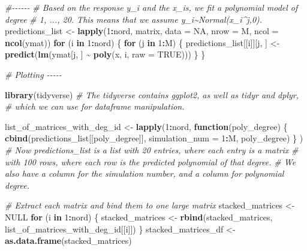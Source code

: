 \documentclass[
]{article}
\newenvironment{Shaded}{\begin{snugshade}}{\end{snugshade}}
\newcommand{\AttributeTok}[1]{\textcolor[rgb]{0.13,0.29,0.53}{#1}}
\newcommand{\CommentTok}[1]{\textcolor[rgb]{0.56,0.35,0.01}{\textit{#1}}}
\newcommand{\ConstantTok}[1]{\textcolor[rgb]{0.56,0.35,0.01}{#1}}
\newcommand{\ControlFlowTok}[1]{\textcolor[rgb]{0.13,0.29,0.53}{\textbf{#1}}}
\newcommand{\DecValTok}[1]{\textcolor[rgb]{0.00,0.00,0.81}{#1}}
\newcommand{\FunctionTok}[1]{\textcolor[rgb]{0.13,0.29,0.53}{\textbf{#1}}}
\newcommand{\NormalTok}[1]{#1}
\newcommand{\OtherTok}[1]{\textcolor[rgb]{0.56,0.35,0.01}{#1}}
\newcommand{\SpecialCharTok}[1]{\textcolor[rgb]{0.81,0.36,0.00}{\textbf{#1}}}
\begin{document}
\begin{Shaded}
\begin{Highlighting}[]
\CommentTok{\#{-}{-}{-}{-}{-}{-}}
\CommentTok{\# Based on the response y\_i and the x\_i\textquotesingle{}s, we fit a polynomial model of degree}
\CommentTok{\# 1, ..., 20. This means that we assume y\_i\textasciitilde{}Normal(x\_i\^{}j,0). }
\NormalTok{predictions\_list }\OtherTok{\textless{}{-}} \FunctionTok{lapply}\NormalTok{(}\DecValTok{1}\SpecialCharTok{:}\NormalTok{nord, matrix, }\AttributeTok{data =} \ConstantTok{NA}\NormalTok{, }\AttributeTok{nrow =}\NormalTok{ M, }\AttributeTok{ncol =} \FunctionTok{ncol}\NormalTok{(ymat))}
\ControlFlowTok{for}\NormalTok{ (i }\ControlFlowTok{in} \DecValTok{1}\SpecialCharTok{:}\NormalTok{nord) \{}
  \ControlFlowTok{for}\NormalTok{ (j }\ControlFlowTok{in} \DecValTok{1}\SpecialCharTok{:}\NormalTok{M) \{}
\NormalTok{    predictions\_list[[i]][j, ] }\OtherTok{\textless{}{-}} \FunctionTok{predict}\NormalTok{(}\FunctionTok{lm}\NormalTok{(ymat[j, ] }\SpecialCharTok{\textasciitilde{}} \FunctionTok{poly}\NormalTok{(x, i, }\AttributeTok{raw =} \ConstantTok{TRUE}\NormalTok{))) }
\NormalTok{  \}}
\NormalTok{\}}

\CommentTok{\# Plotting {-}{-}{-}{-}{-}}

\FunctionTok{library}\NormalTok{(tidyverse) }\CommentTok{\# The tidyverse contains ggplot2, as well as tidyr and dplyr, }
\CommentTok{\# which we can use for dataframe manipulation.}

\NormalTok{list\_of\_matrices\_with\_deg\_id }\OtherTok{\textless{}{-}} 
  \FunctionTok{lapply}\NormalTok{(}\DecValTok{1}\SpecialCharTok{:}\NormalTok{nord, }
         \ControlFlowTok{function}\NormalTok{(poly\_degree) \{}
           \FunctionTok{cbind}\NormalTok{(predictions\_list[[poly\_degree]], }
                 \AttributeTok{simulation\_num =} \DecValTok{1}\SpecialCharTok{:}\NormalTok{M, poly\_degree)}
\NormalTok{         \}}
\NormalTok{  )}
\CommentTok{\# Now predictions\_list is a list with 20 entries, where each entry is a matrix }
\CommentTok{\# with 100 rows, where each row is the predicted polynomial of that degree.}
\CommentTok{\# We also have a column for the simulation number, and a column for polynomial degree.}

\CommentTok{\# Extract each matrix and bind them to one large matrix}
\NormalTok{stacked\_matrices }\OtherTok{\textless{}{-}}  \ConstantTok{NULL}
\ControlFlowTok{for}\NormalTok{ (i }\ControlFlowTok{in} \DecValTok{1}\SpecialCharTok{:}\NormalTok{nord) \{}
\NormalTok{  stacked\_matrices }\OtherTok{\textless{}{-}}
    \FunctionTok{rbind}\NormalTok{(stacked\_matrices, list\_of\_matrices\_with\_deg\_id[[i]])}
\NormalTok{\}}
\NormalTok{stacked\_matrices\_df }\OtherTok{\textless{}{-}} \FunctionTok{as.data.frame}\NormalTok{(stacked\_matrices)}


\end{Highlighting}
\end{Shaded}
\end{document}
